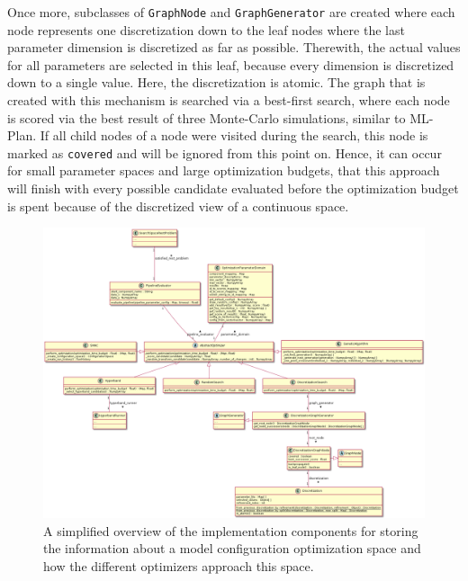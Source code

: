 \begin{itemize}
    Once more, subclasses of \texttt{GraphNode} and \texttt{GraphGenerator} are created where each node represents one discretization down to the leaf nodes where the last parameter dimension is discretized as far as possible.
    Therewith, the actual values for all parameters are selected in this leaf, because every dimension is discretized down to a single value. 
    Here, the discretization is atomic.\newline
    The graph that is created with this mechanism is searched via a best-first search, where each node is scored via the best result of three Monte-Carlo simulations, similar to ML-Plan.
    If all child nodes of a node were visited during the search, this node is marked as \texttt{covered} and will be ignored from this point on.
    Hence, it can occur for small parameter spaces and large optimization budgets, that this approach will finish with every possible candidate evaluated before the optimization budget is spent because of the discretized view of a continuous space.
\end{itemize}

\begin{figure}[ht!]
    \centering
    \includegraphics[angle=90,origin=c,width=\textwidth,height=0.9\textheight,keepaspectratio]{gfx/Figures/Implementation/optimization/PipelineOptimization.png}
    \caption{A simplified overview of the implementation components for storing the information about a model configuration optimization space and how the different optimizers approach this space.}
    \label{fig:implementation:uml:optimization}
\end{figure}

